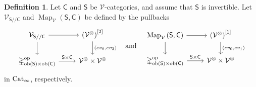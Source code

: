 \documentclass[10pt]{amsart}
\numberwithin{equation}{section}
\theoremstyle{definition}
\newtheorem{definition}[prop]{Definition}
\DeclareMathOperator{\Map}{Map}
\DeclareMathOperator{\ob}{ob}
\DeclareMathOperator{\op}{op}
\newcommand{\Cat}{\mathrm{Cat}\vphantom{t}}
\newcommand{\Simp}{\mathbb{\Delta}}
\newcommand{\cV}{\mathcal{V}}
\newcommand{\sfC}{\mathsf{C}}
\newcommand{\sfS}{\mathsf{S}}
\begin{document}
	\begin{definition}\label{def:double_slices}
		Let $\sfC$ and $\sfS$ be $\cV$-categories, and assume that $\sfS$ is invertible.
		Let $\cV_{\sfS/ /\sfC}$ and  $\Map_{\cV}\left(\sfS, \sfC \right)$ be defined by the pullbacks
		\begin{equation}\label{eq:double_slices}
			\begin{tikzcd}
				\cV_{\sfS/ /\sfC} \arrow[r] \arrow[d] & \left(\cV^{\otimes} \right)^{[2]} \arrow[d, "(ev_0 {, } ev_{2})" ]\\
				\Simp^{\op}_{\ob(\sfS)\times \ob(\sfC)} \arrow[r, "\sfS\times \sfC"] & \cV^{\otimes} \times \cV^{\otimes}
			\end{tikzcd}
			\quad \text{and} \quad
			\begin{tikzcd}
				\Map_{\cV}\left(\sfS,\sfC \right) \arrow[r] \arrow[d] & \left(\cV^{\otimes} \right)^{[1]} \arrow[d, "(ev_0 {, } ev_1)"] \\
				\Simp^{\op}_{\ob(\sfS)\times \ob(\sfC)} \arrow[r, "\sfS\times\sfC"] & \cV^{\otimes}\times\cV^{\otimes}
			\end{tikzcd}
		\end{equation}
		in $\Cat_\infty$, respectively.
	\end{definition}
\end{document}
